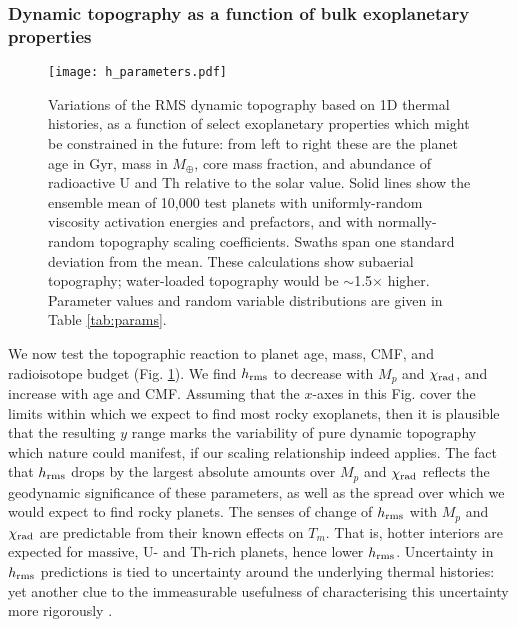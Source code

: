 \subsubsection{Dynamic topography as a function of bulk exoplanetary properties}
\label{sec:results-parameters}

\begin{figure}
    \centering
    \texttt{[image: h\_parameters.pdf]}
    \caption[Variations of the RMS dynamic topography based on 1D thermal histories, as a function of select exoplanetary properties which might be constrained in the future.]{Variations of the RMS dynamic topography based on 1D thermal histories, as a function of select exoplanetary properties which might be constrained in the future: from left to right these are the planet age in Gyr, mass in $M_\oplus$, core mass fraction, and abundance of radioactive U and Th relative to the solar value. Solid lines show the ensemble mean of 10,000 test planets with uniformly-random viscosity activation energies and prefactors, and with normally-random topography scaling coefficients. Swaths span one standard deviation from the mean. These calculations show subaerial topography; water-loaded topography would be $\sim$1.5$\times$ higher. Parameter values and random variable distributions are given in Table \ref{tab:params}.}
    \label{fig:1D-h-scale}
\end{figure}


We now test the topographic reaction to planet age, mass, CMF, and radioisotope budget (Fig. \ref{fig:1D-h-scale}). We find $h_{\rm rms}$ to decrease with $M_p$ and $\chi_{\rm rad}$, and increase with age and CMF. Assuming that the $x$-axes in this Fig. cover the limits within which we expect to find most rocky exoplanets, then it is plausible that the resulting $y$ range marks the variability of pure dynamic topography which nature could manifest, if our scaling relationship indeed applies. The fact that $h_{\rm rms}$ drops by the largest absolute amounts over $M_p$ and $\chi_{\rm rad}$ reflects the geodynamic significance of these parameters, as well as the spread over which we would expect to find rocky planets. The senses of change of $h_{\rm rms}$ with $M_p$ and $\chi_{\rm rad}$ are predictable from their known effects on $T_m$. That is, hotter interiors are expected for massive, U- and Th-rich planets, hence lower $h_{\rm rms}$. Uncertainty in $h_{\rm rms}$ predictions is tied to uncertainty around the underlying thermal histories: yet another clue to the immeasurable usefulness of characterising this uncertainty more rigorously \citep[e.g.,][]{seales_uncertainty_2020}.

